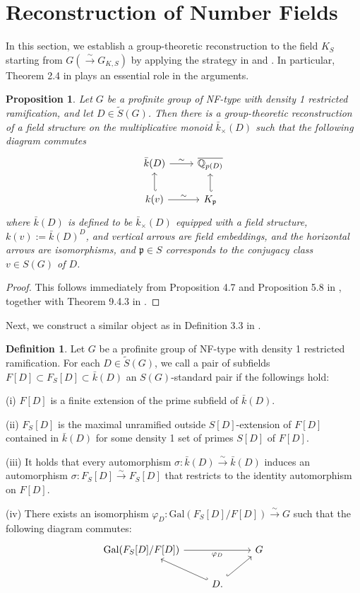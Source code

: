 \documentclass{article}
\theoremstyle{plain}
\newtheorem{prop}[thm]{Proposition}
\theoremstyle{definition}
\newtheorem{defn}[thm]{Definition}
\theoremstyle{remark}
\begin{document}
\section{Reconstruction of Number Fields}
In this section, we establish a group-theoretic reconstruction to the field $K_S$ starting from $G(\xrightarrow{\sim} G_{K,S})$ by applying the strategy in \cite{Ho1} and \cite{Ho2}. In particular, Theorem 2.4 in \cite{Shi2} plays an essential role in the arguments.
\begin{prop}
Let $G$ be a profinite group of NF-type with density 1 restricted ramification, and let $D \in \widetilde{S}(G)$. Then there is a group-theoretic reconstruction of a field structure on the multiplicative monoid $\bar k_{\times}(D)$ such that the following diagram commutes
$$
\begin{tikzcd}
	{\bar k(D)} & {\overline{\mathbb Q_{p(D)}}} \\
	{k(v)} & {K_{\mathfrak p}}
	\arrow["\sim", from=1-1, to=1-2]
	\arrow[hook', from=2-1, to=1-1]
	\arrow["\sim", from=2-1, to=2-2]
	\arrow[hook', from=2-2, to=1-2]
\end{tikzcd}
$$
where $\bar k(D)$ is defined to be $\bar k_{\times}(D)$ equipped with a field structure, $k(v) := \bar k(D)^D$, and vertical arrows are field embeddings, and the horizontal arrows are isomorphisms, and $\mathfrak{p} \in S$ corresponds to the conjugacy class $v \in S(G)$ of $D$. 
\end{prop}
\begin{proof}
This follows immediately from Proposition 4.7 and Proposition 5.8 in \cite{Ho1}, together with Theorem 9.4.3 in \cite{NSW}.
\end{proof}
Next, we construct a similar object as in Definition 3.3 in \cite{Ho2}.
\begin{defn}
Let $G$ be a profinite group of NF-type with density 1 restricted ramification. For each $D \in \widetilde{S}(G)$, we call a pair of subfields $F[D] \subset F_S[D] \subset \bar k(D)$ an $S(G)$-standard pair if the followings hold: \par
(i) $F[D]$ is a finite extension of the prime subfield of $\bar k(D)$. \par 
(ii) $F_S[D]$ is the maximal unramified outside $S[D]$-extension of $F[D]$ contained in $\bar k(D)$ for some density 1 set of primes $S[D]$ of $F[D]$. \par 
(iii) It holds that every automorphism $\sigma : \bar k(D) \xrightarrow{\sim} \bar k(D)$ induces an automorphism $\sigma: F_S[D] \xrightarrow{\sim} F_S[D]$ that restricts to the identity automorphism on $F[D]$. \par 
(iv) There exists an isomorphism $\varphi_D: \text{Gal}(F_S[D]/F[D]) \xrightarrow{\sim} G$ such that the following diagram commutes:
$$
\begin{tikzcd}
	{\text{Gal}(F_S[D]/F[D])} && G \\
	& D.
	\arrow["{\varphi_D}"', from=1-1, to=1-3]
	\arrow[hook', from=2-2, to=1-1]
	\arrow[hook, from=2-2, to=1-3]
\end{tikzcd}
$$
\end{defn}
\end{document}
